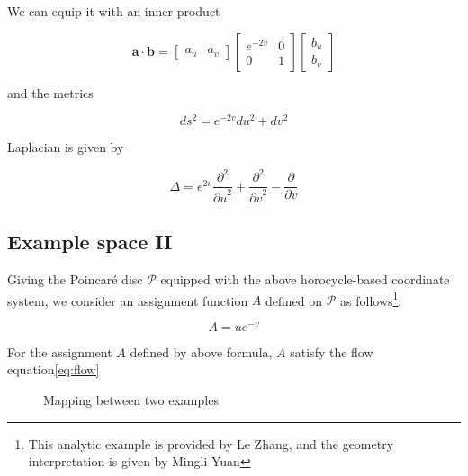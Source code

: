 We can equip it with an inner product

\[
\mathbf{a} \cdot \mathbf{b} = \begin{bmatrix} a_u & a_v \end{bmatrix} \begin{bmatrix} e^{-2v} & 0 \\ 0 & 1 \end{bmatrix} \begin{bmatrix} b_u \\ b_v \end{bmatrix}
\]

and the metrics

$$
ds^2 = e^{-2v} du^2 + dv^2
$$

Laplacian is given by\cite{Costa2001ADO}

$$
\Delta = e^{2v} \frac{\partial^2}{{\partial u}^2} + \frac{\partial^2}{{\partial v}^2} - \frac{\partial}{\partial v}
$$

\subsection{Example space II}\label{subsec:exmp2}

Giving the Poincaré disc $\mathcal{P}$ equipped with the above horocycle-based coordinate system,
we consider an assignment function $A$ defined on $\mathcal{P}$ as follows\footnote{This analytic example is provided by Le Zhang, and the geometry interpretation is given by Mingli Yuan}:

\begin{equation}
A = u e^{-v}
\end{equation}

\begin{theorem}
For the assignment $A$ defined by above formula, $A$ satisfy the flow equation\eqref{eq:flow}
\end{theorem}

\begin{figure}[ht]
\centering
{}
\caption{Mapping between two examples}\label{fig:mapping}
\end{figure}

